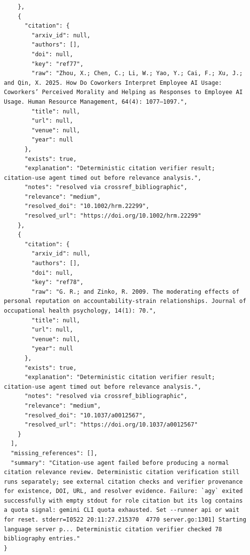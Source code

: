\documentclass[11pt]{article}
\begin{document}
\begin{verbatim}
    },
    {
      "citation": {
        "arxiv_id": null,
        "authors": [],
        "doi": null,
        "key": "ref77",
        "raw": "Zhou, X.; Chen, C.; Li, W.; Yao, Y.; Cai, F.; Xu, J.; and Qin, X. 2025. How Do Coworkers Interpret Employee AI Usage: Coworkers’ Perceived Morality and Helping as Responses to Employee AI Usage. Human Resource Management, 64(4): 1077–1097.",
        "title": null,
        "url": null,
        "venue": null,
        "year": null
      },
      "exists": true,
      "explanation": "Deterministic citation verifier result; citation-use agent timed out before relevance analysis.",
      "notes": "resolved via crossref_bibliographic",
      "relevance": "medium",
      "resolved_doi": "10.1002/hrm.22299",
      "resolved_url": "https://doi.org/10.1002/hrm.22299"
    },
    {
      "citation": {
        "arxiv_id": null,
        "authors": [],
        "doi": null,
        "key": "ref78",
        "raw": "G. R.; and Zinko, R. 2009. The moderating effects of personal reputation on accountability-strain relationships. Journal of occupational health psychology, 14(1): 70.",
        "title": null,
        "url": null,
        "venue": null,
        "year": null
      },
      "exists": true,
      "explanation": "Deterministic citation verifier result; citation-use agent timed out before relevance analysis.",
      "notes": "resolved via crossref_bibliographic",
      "relevance": "medium",
      "resolved_doi": "10.1037/a0012567",
      "resolved_url": "https://doi.org/10.1037/a0012567"
    }
  ],
  "missing_references": [],
  "summary": "Citation-use agent failed before producing a normal citation relevance review. Deterministic citation verification still runs separately; see external citation checks and verifier provenance for existence, DOI, URL, and resolver evidence. Failure: `agy` exited successfully with empty stdout for role citation but its log contains a quota signal: gemini CLI quota exhausted. Set --runner api or wait for reset. stderr=I0522 20:11:27.215370  4770 server.go:1301] Starting language server p... Deterministic citation verifier checked 78 bibliography entries."
}
\end{verbatim}
\end{document}
